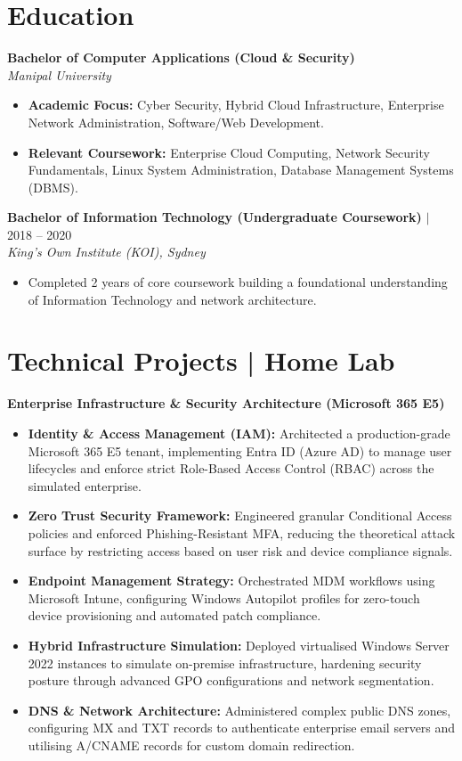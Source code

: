 \documentclass[letterpaper,10pt]{article}
\begin{document}
\section{Education}
\textbf{Bachelor of Computer Applications (Cloud \& Security)} \\
\textit{Manipal University}
\vspace{2pt}
\begin{itemize}
  \item \textbf{Academic Focus:} Cyber Security, Hybrid Cloud Infrastructure, Enterprise Network Administration, Software/Web Development.
  \item \textbf{Relevant Coursework:} Enterprise Cloud Computing, Network Security Fundamentals, Linux System Administration, Database Management Systems (DBMS).
\end{itemize}

\vspace{5pt}

\textbf{Bachelor of Information Technology (Undergraduate Coursework)} $|$ 2018 -- 2020 \\
\textit{King's Own Institute (KOI), Sydney}
\begin{itemize}
  \item Completed 2 years of core coursework building a foundational understanding of Information Technology and network architecture.
\end{itemize}

\section{Technical Projects | Home Lab}
\textbf{Enterprise Infrastructure \& Security Architecture (Microsoft 365 E5)}
\begin{itemize}
  \item \textbf{Identity \& Access Management (IAM):} Architected a production-grade Microsoft 365 E5 tenant, implementing Entra ID (Azure AD) to manage user lifecycles and enforce strict Role-Based Access Control (RBAC) across the simulated enterprise.
  \item \textbf{Zero Trust Security Framework:} Engineered granular Conditional Access policies and enforced Phishing-Resistant MFA, reducing the theoretical attack surface by restricting access based on user risk and device compliance signals.
  \item \textbf{Endpoint Management Strategy:} Orchestrated MDM workflows using Microsoft Intune, configuring Windows Autopilot profiles for zero-touch device provisioning and automated patch compliance.
  \item \textbf{Hybrid Infrastructure Simulation:} Deployed virtualised Windows Server 2022 instances to simulate on-premise infrastructure, hardening security posture through advanced GPO configurations and network segmentation.
  \item \textbf{DNS \& Network Architecture:} Administered complex public DNS zones, configuring MX and TXT records to authenticate enterprise email servers and utilising A/CNAME records for custom domain redirection.
\end{itemize}
\end{document}
